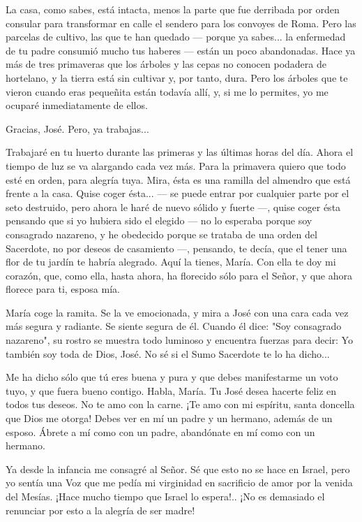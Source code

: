 \documentclass[12pt, twoside, openright]{book} %
\begin{document}
La casa, como sabes, está intacta, menos la parte que fue derribada por orden consular para transformar en calle el sendero para los convoyes de Roma. Pero las parcelas de cultivo, las que te han quedado — porque ya sabes... la enfermedad de tu padre consumió mucho tus haberes — están un poco abandonadas. Hace ya más de tres primaveras que los árboles y las cepas no conocen podadera de hortelano, y la tierra está sin cultivar y, por tanto, dura. Pero los árboles que te vieron cuando eras pequeñita están todavía allí, y, si me lo permites, yo me ocuparé inmediatamente de ellos. 

Gracias, José. Pero, ya trabajas... 

Trabajaré en tu huerto durante las primeras y las últimas horas del día. Ahora el tiempo de luz se va alargando cada vez más. Para la primavera quiero que todo esté en orden, para alegría tuya. Mira, ésta es una ramilla del almendro que está frente a la casa. Quise coger ésta... — se puede entrar por cualquier parte por el seto destruido, pero ahora le haré de nuevo sólido y fuerte —, quise coger ésta pensando que si yo hubiera sido el elegido — no lo esperaba porque soy consagrado nazareno, y he obedecido porque se trataba de una orden del Sacerdote, no por deseos de casamiento —, pensando, te decía, que el tener una flor de tu jardín te habría alegrado. Aquí la tienes, María. Con ella te doy mi corazón, que, como ella, hasta ahora, ha florecido sólo para el Señor, y que ahora florece para ti, esposa mía. 

María coge la ramita. Se la ve emocionada, y mira a José con una cara cada vez más segura y radiante. Se siente segura de él. Cuando él dice: "Soy consagrado nazareno", su rostro se muestra todo luminoso y encuentra fuerzas para decir: Yo también soy toda de Dios, José. No sé si el Sumo Sacerdote te lo ha dicho... 

Me ha dicho sólo que tú eres buena y pura y que debes manifestarme un voto tuyo, y que fuera bueno contigo. Habla, María. Tu José desea hacerte feliz en todos tus deseos. No te amo con la carne. ¡Te amo con mi espíritu, santa doncella que Dios me otorga! Debes ver en mí un padre y un hermano, además de un esposo. Ábrete a mí como con un padre, abandónate en mí como con un hermano. 

Ya desde la infancia me consagré al Señor. Sé que esto no se hace en Israel, pero yo sentía una Voz que me pedía mi virginidad en sacrificio de amor por la venida del Mesías. ¡Hace mucho tiempo que Israel lo espera!.. ¡No es demasiado el renunciar por esto a la alegría de ser madre! 
\end{document}
